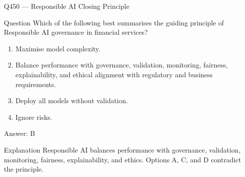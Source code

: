 \documentclass[aspectratio=169,8pt]{beamer}
\begin{document}
	\begin{frame}{Q450 --- Responsible AI Closing Principle}
		\begin{block}{Question}
			Which of the following best summarises the guiding principle of Responsible AI governance in financial services?
			\begin{enumerate}
				\item Maximise model complexity.
				\item Balance performance with governance, validation, monitoring, fairness, explainability, and ethical alignment with regulatory and business requirements.
				\item Deploy all models without validation.
				\item Ignore risks.
			\end{enumerate}
		\end{block}
		\begin{exampleblock}{Answer: B}\end{exampleblock}
		\begin{block}{Explanation}
			Responsible AI balances performance with governance, validation, monitoring, fairness, explainability, and ethics. Options A, C, and D contradict the principle.
		\end{block}
	\end{frame}
	
\end{document}
